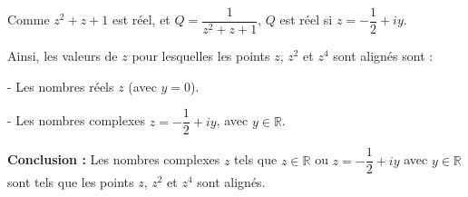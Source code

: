 \documentclass[a4paper,12pt]{article}
\begin{document}
\begin{solutionbox}
Comme \( z^2 + z + 1 \) est réel, et \( Q = \dfrac{1}{z^2 + z + 1} \), \( Q \) est réel si \( z = -\dfrac{1}{2} + i y \).

Ainsi, les valeurs de \( z \) pour lesquelles les points \( z \), \( z^2 \) et \( z^4 \) sont alignés sont :

- Les nombres réels \( z \) (avec \( y = 0 \)).

- Les nombres complexes \( z = -\dfrac{1}{2} + i y \), avec \( y \in \mathbb{R} \).

\textbf{Conclusion :} Les nombres complexes \( z \) tels que \( z \in \mathbb{R} \) ou \( z = -\dfrac{1}{2} + i y \) avec \( y \in \mathbb{R} \) sont tels que les points \( z \), \( z^2 \) et \( z^4 \) sont alignés.

\end{solutionbox}
\end{document}

